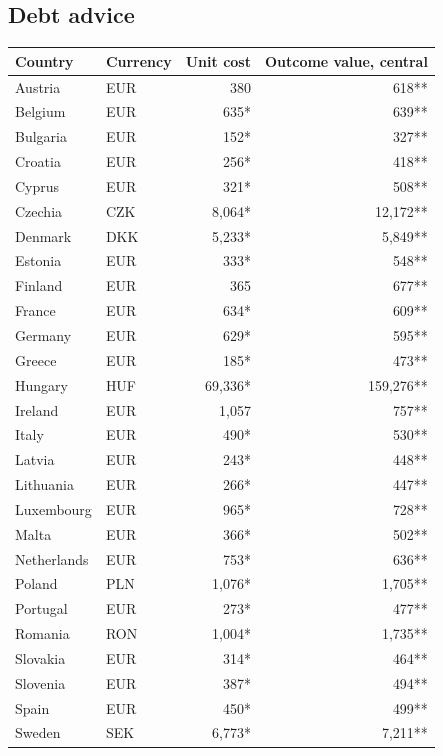 \subsection*{Debt advice}
\begin{longtable}{llrr}
\toprule
Country & Currency & Unit cost & Outcome value, central \\
\midrule
\endhead
Austria & EUR & 380 & 618** \\
Belgium & EUR & 635* & 639** \\
Bulgaria & EUR & 152* & 327** \\
Croatia & EUR & 256* & 418** \\
Cyprus & EUR & 321* & 508** \\
Czechia & CZK & 8,064* & 12,172** \\
Denmark & DKK & 5,233* & 5,849** \\
Estonia & EUR & 333* & 548** \\
Finland & EUR & 365 & 677** \\
France & EUR & 634* & 609** \\
Germany & EUR & 629* & 595** \\
Greece & EUR & 185* & 473** \\
Hungary & HUF & 69,336* & 159,276** \\
Ireland & EUR & 1,057 & 757** \\
Italy & EUR & 490* & 530** \\
Latvia & EUR & 243* & 448** \\
Lithuania & EUR & 266* & 447** \\
Luxembourg & EUR & 965* & 728** \\
Malta & EUR & 366* & 502** \\
Netherlands & EUR & 753* & 636** \\
Poland & PLN & 1,076* & 1,705** \\
Portugal & EUR & 273* & 477** \\
Romania & RON & 1,004* & 1,735** \\
Slovakia & EUR & 314* & 464** \\
Slovenia & EUR & 387* & 494** \\
Spain & EUR & 450* & 499** \\
Sweden & SEK & 6,773* & 7,211** \\
\bottomrule
\end{longtable}

